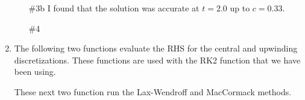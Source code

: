 \documentclass[11pt, oneside]{article}
\begin{document}
\begin{enumerate}
\begin{enumerate}
      \item[\#3b]
        I found that the solution was accurate at $t = 2.0$ up to $c = 0.33$.

      \item[\#4]
    \end{enumerate}

  \item %

    The following two functions evaluate the RHS for the central and
    upwinding discretizations.
    These functions are used with the RK2 function that we have been using.
    
    
    These next two function run the Lax-Wendroff and MacCormack methods.
    
    


\end{enumerate}
\end{document}
